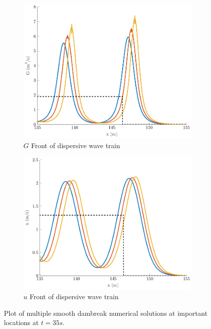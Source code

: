\documentclass[10pt]{article}
\begin{document}
\begin{figure}
\begin{subfigure}{0.32\textwidth}
	\includegraphics[width=\textwidth]{./Figures/Simulations/Study/ImpDisp/GFront.pdf}
	\caption{$G$ Front of dispersive wave train}
	\end{subfigure}
	\begin{subfigure}{0.32\textwidth}
	\centering
	\includegraphics[width=\textwidth]{./Figures/Simulations/Study/ImpDisp/uFront.pdf}
	\caption{$u$ Front of dispersive wave train}
	\end{subfigure}

	\caption{Plot of multiple smooth dambreak numerical solutions at important locations at $t=35s$.}
\end{figure}
\end{document}
